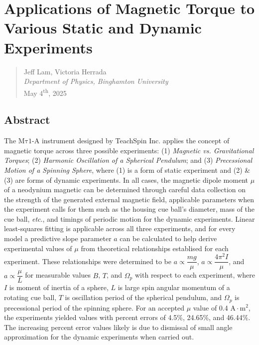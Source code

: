 \documentclass[12pt]{article}
\newcommand{\mtauonea}{\mathrm{M\tau1}\text{-}\mathrm{A}}
\begin{document}

\section*{Applications of Magnetic Torque to Various Static and Dynamic Experiments}

\begin{quote}
    Jeff Lam, Victoria Herrada \\
    \textit{Department of Physics, Binghamton University} \\
    May 4\textsuperscript{th}, 2025
\end{quote}

\subsection*{Abstract}
The $\mtauonea$ instrument designed by TeachSpin Inc. applies the concept of magnetic torque
across three possible experiments:
(1) \textit{Magnetic vs. Gravitational Torques};
(2) \textit{Harmonic Oscillation of a Spherical Pendulum};
and (3) \textit{Precessional Motion of a Spinning
Sphere}, where (1) is a form of static experiment and (2) \& (3) are forms of dynamic experiments.
In all cases, the magnetic dipole moment $\mu$ of a neodynium magnetic can be determined
through careful data collection on the strength of the generated external magnetic field,
applicable parameters when the experiment calls for them such as the housing cue ball's diameter,
mass of the cue ball, \textit{etc}., and timings of periodic motion for the dynamic experiments.
Linear least-squares fitting is applicable across all three experiments,
and for every model a predictive slope parameter $a$ can be calculated to help
derive experimental values of $\mu$ from theoretical relationships establised for each experiment.
These relationships were determined to be $a\propto\dfrac{mg}{\mu}$, $a\propto\dfrac{4\pi^2I}{\mu}$,
and $a\propto\dfrac{\mu}{L}$ for measurable values $B$, $T$, and $\Omega_p$ with respect to each experiment,
where $I$ is moment of inertia of a sphere, $L$ is large spin angular momentum of a rotating cue ball,
$T$ is oscillation period of the spherical pendulum, and $\Omega_p$ is precessional period of the spinning sphere.
For an accepted $\mu$ value of 0.4 $\mathrm{A\cdot m^2}$,
the experiments yielded values with percent errors of 4.5\%, 24.65\%, and 46.44\%.
The increasing percent error values likely is due to dismissal of small angle approximation
for the dynamic experiments when carried out.
\end{document}
